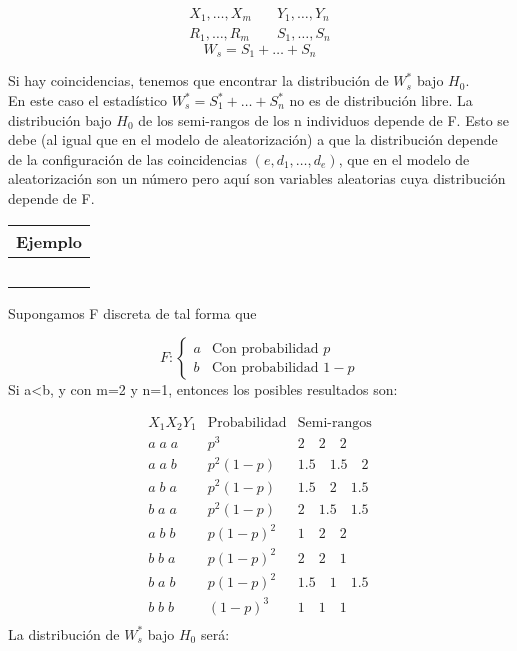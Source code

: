 $$
\begin{aligned}
    X_1,\dots, X_m & \quad Y_1,\dots,Y_n\\
    R_1,\dots, R_m & \quad S_1,\dots,S_n
\end{aligned}
$$
$$
W_s=S_1+\dots+S_n
$$

Si hay coincidencias, tenemos que encontrar la distribución de $W^*_s$ bajo $H_0$. \\
En este caso el estadístico $W^*_s=S^*_1+\dots+S^*_n$ no es de distribución libre. La distribución bajo $H_0$ de los semi-rangos de los n individuos depende de F. 
Esto se debe (al igual que en el modelo de aleatorización) a que la distribución depende de la configuración de las coincidencias $(e,d_1,\dots,d_e)$, que en el modelo de aleatorización son un número pero aquí son variables aleatorias cuya distribución depende de F.\\

\hspace{-1cm}\noindent\begin{tabular}{r}
    \textbf{Ejemplo}  \\ \hline \ \\
\end{tabular}

    Supongamos F discreta de tal forma que 
    
    $$
        F:\begin{cases}
            a & \text{Con probabilidad } p \\
            b & \text{Con probabilidad } 1-p
        \end{cases}
    $$
    Si a<b, y con m=2 y n=1, entonces los posibles resultados son:

    $$
    \begin{array}{c|c|c}
        X_1X_2Y_1 & \text{Probabilidad} & \text{Semi-rangos} \\ \hline
        a \; a \; a & p^3 & 2 \quad 2 \quad 2 \\ 
        a \; a \; b & p^2(1-p) & 1.5 \quad 1.5 \quad 2 \\ 
        a \; b \; a & p^2(1-p) & 1.5 \quad 2 \quad 1.5 \\ 
        b \; a \; a & p^2(1-p) & 2 \quad 1.5 \quad 1.5 \\ 
        a \; b \; b & p(1-p)^2 & 1 \quad 2 \quad 2 \\ 
        b \; b \; a & p(1-p)^2 & 2 \quad 2 \quad 1 \\ 
        b \; a \; b & p(1-p)^2 & 1.5 \quad 1 \quad 1.5 \\ 
        b \; b \; b & (1-p)^3 & 1 \quad 1 \quad 1 \\ 
    \end{array}
    $$
    La distribución de $W^*_s$ bajo $H_0$ será:

